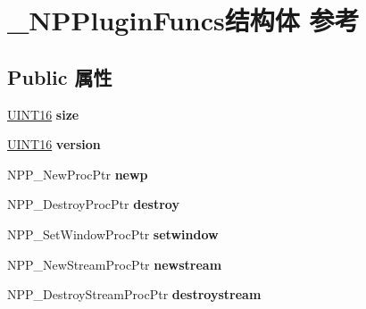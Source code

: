 \hypertarget{struct___n_p_plugin_funcs}{}\section{\+\_\+\+N\+P\+Plugin\+Funcs结构体 参考}
\label{struct___n_p_plugin_funcs}
\subsection*{Public 属性}
\begin{DoxyCompactItemize}
\item 
\mbox{\label{struct___n_p_plugin_funcs_afe2f5e8677e8387848a0d4c8caf686ae}} 
\hyperlink{_processor_bind_8h_a09f1a1fb2293e33483cc8d44aefb1eb1}{U\+I\+N\+T16} {\bfseries size}
\item 
\mbox{\label{struct___n_p_plugin_funcs_a06ea0264dd97665044d7ca42dc230e47}} 
\hyperlink{_processor_bind_8h_a09f1a1fb2293e33483cc8d44aefb1eb1}{U\+I\+N\+T16} {\bfseries version}
\item 
\mbox{\label{struct___n_p_plugin_funcs_aa55ed6ac4e90cb95225606b0b07d55bc}} 
N\+P\+P\+\_\+\+New\+Proc\+Ptr {\bfseries newp}
\item 
\mbox{\label{struct___n_p_plugin_funcs_a4ac404eacf1b7df7d7d56893833af018}} 
N\+P\+P\+\_\+\+Destroy\+Proc\+Ptr {\bfseries destroy}
\item 
\mbox{\label{struct___n_p_plugin_funcs_a5535af5c8168fe6e4d2ecfe3af1c5667}} 
N\+P\+P\+\_\+\+Set\+Window\+Proc\+Ptr {\bfseries setwindow}
\item 
\mbox{\label{struct___n_p_plugin_funcs_a90845b9d85755161e49c729a95946c21}} 
N\+P\+P\+\_\+\+New\+Stream\+Proc\+Ptr {\bfseries newstream}
\item 
\mbox{\label{struct___n_p_plugin_funcs_a42e0e0834c9ec36eecd4a6de950b5461}} 
N\+P\+P\+\_\+\+Destroy\+Stream\+Proc\+Ptr {\bfseries destroystream}
\item 
\mbox{\label{struct___n_p_plugin_funcs_a319c2eff17541dcb01d89089b2cbdd9e}} 

\end{DoxyCompactItemize}
